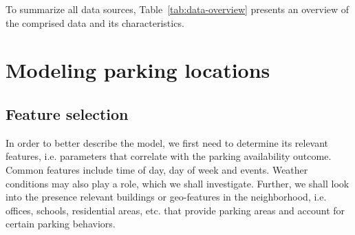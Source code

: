 \documentclass{article}
\begin{document}
\vspace{2mm}
To summarize all data sources, Table~\ref{tab:data-overview} presents an overview of the comprised data and its characteristics.

\begin{table}
	\caption{Data overview and its features}
    \label{tab:data-overview}
\end{table}

\section{Modeling parking locations}
\subsection{Feature selection}
In order to better describe the model, we first need to determine its relevant features, i.e. parameters that correlate with the parking availability outcome. Common features include time of day, day of week and events\cite{Caicedo}\cite{Chen}\cite{Hoessinger2014}. Weather conditions may also play a role, which we shall investigate. Further, we shall look into the presence relevant buildings or geo-features in the neighborhood, i.e. offices, schools, residential areas, etc. that provide parking areas and account for certain parking behaviors.
\end{document}

